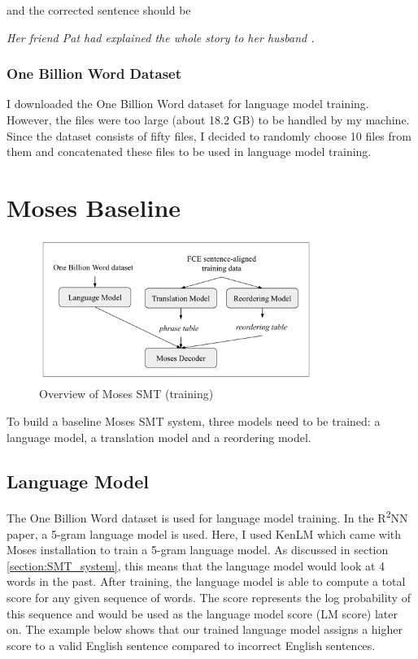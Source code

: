\documentclass[12pt,a4paper,twoside,openright]{report}
\begin{document}
and the corrected sentence should be

\textit{Her friend Pat had explained the whole story to her husband .}

\subsubsection{One Billion Word Dataset}

I downloaded the One Billion Word dataset for language model training. However, the files were too large (about 18.2 GB) to be handled by my machine. Since the dataset consists of fifty files, I decided to randomly choose 10 files from them and concatenated these files to be used in language model training. 


\section{Moses Baseline} \label{section:moses_baseline}

\begin{figure}[ht]
\centering
\includegraphics[width=0.8\textwidth]{images/moses_pipeline.png}
\caption{Overview of Moses SMT (training)}
\label{fig:moses_pipeline}
\end{figure}

To build a baseline Moses SMT system, three models need to be trained: a language model, a translation model and a reordering model.

\subsection{Language Model}\label{section:moses_lm}
The One Billion Word dataset is used for language model training. In the R\textsuperscript{2}NN paper, a 5-gram language model is used. Here, I used KenLM which came with Moses installation to train a 5-gram language model. As discussed in section \ref{section:SMT_system}, this means that the language model would look at 4 words in the past. After training, the language model is able to compute a total score for any given sequence of words. The score represents the log probability of this sequence and would be used as the language model score (LM score) later on. The example below shows that our trained language model assigns a higher score to a valid English sentence compared to incorrect English sentences.
\end{document}
